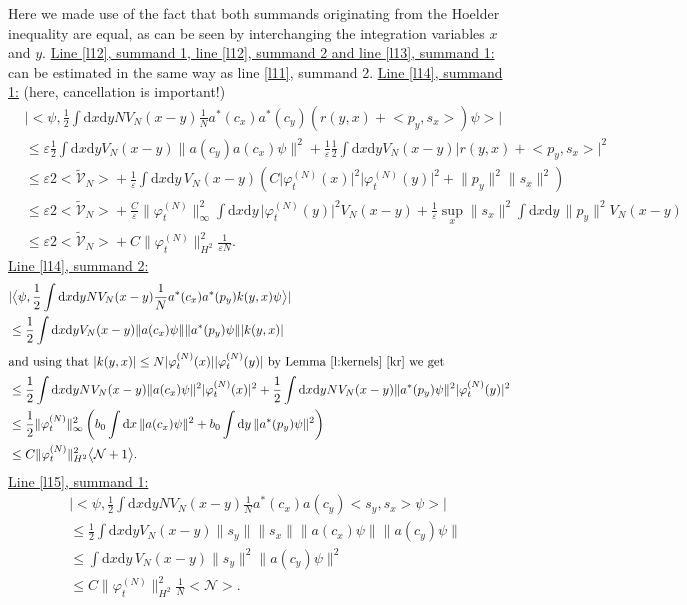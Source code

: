 \documentclass[11pt,a4paper,draft,DIV11]{scrartcl}	%
\newcommand{\di}{\textrm{d}}		%
\newcommand{\Ncal}{\mathcal{N}}		%
\newcommand{\tilV}{\tilde{\mathcal{V}}_N}		%
\newcommand{\estlist}[2]{\underline{Line \ref{l#1}, summand #2:}}
\newcommand{\nestlist}[2]{line \ref{l#1}, summand #2}
\newcommand{\Nestlist}[2]{Line \ref{l#1}, summand #2}
\newcommand{\scal}[2]{\big<#1,#2\big>} %
\newcommand{\norm}[1]{\lVert#1\rVert}	%
\newcommand{\ev}[1]{\big<#1\big>}	%
\newcommand{\ph}{\varphi_t^{(N)}}	%
\newcommand{\dxyNV}{\frac{1}{2}\int \di x\di y N V_N(x-y)} %
\newcommand{\dxyV}{\frac{1}{2}\int \di x\di y V_N(x-y)} %
\begin{document}
Here we made use of the fact that both summands originating from the Hoelder inequality are equal, as can be seen by interchanging the integration variables $x$ and $y$.\newline
\underline{\Nestlist{12}{1}, \nestlist{12}{2} and \nestlist{13}{1}:} can be estimated in the same way as \nestlist{11}{2}.\newline
\estlist{14}{1} (here, cancellation is important!)
\begin{align*}
& \lvert \scal{\psi}{\dxyNV \frac{1}{N}a^\ast(c_x) a^\ast(c_y) \left( r(y,x)+\scal{p_y}{s_x} \right)\psi} \rvert \\
& \leq \varepsilon \dxyV \norm{a(c_y)a(c_x)\psi}^2 + \frac{1}{\varepsilon} \dxyV \lvert r(y,x)+\scal{p_y}{s_x} \rvert^2 \\
& \leq \varepsilon 2\ev{\tilV} + \frac{1}{\varepsilon} \int \di x\di y\, V_N(x-y) \left( C\lvert\ph(x)\rvert^2\lvert\ph(y)\rvert^2 +\norm{p_y}^2\norm{s_x}^2 \right) \\
& \leq \varepsilon 2\ev{\tilV} + \frac{C}{\varepsilon} \norm{\ph}_\infty^2 \int \di x \di y\, \lvert \ph(y)\rvert^2 V_N(x-y) + \frac{1}{\varepsilon} \sup_x\norm{s_x}^2 \int \di x\di y\, \norm{p_y}^2 V_N(x-y) \\
& \leq \varepsilon 2\ev{\tilV} + C\norm{\ph}_{H^2}^2 \frac{1}{\varepsilon N}.
\end{align*}
\estlist{14}{2}
\begin{align*}
& \lvert \scal{\psi}{\dxyNV \frac{1}{N} a^\ast(c_x) a^\ast(p_y) k(y,x)\psi} \rvert \\
& \leq \dxyV \norm{a(c_x)\psi} \norm{a^\ast(p_y)\psi} \lvert k(y,x)\rvert \\
\intertext{and using that $\lvert k(y,x)\rvert \leq N\lvert \ph(x)\rvert\lvert \ph(y)\rvert$ by Lemma \ref{l:kernels} \ref{kr} we get}
& \leq \dxyNV \norm{a(c_x)\psi}^2 \lvert\ph(x)\rvert^2 + \dxyNV \norm{a^\ast(p_y)\psi}^2 \lvert \ph(y)\rvert^2\\
& \leq \frac{1}{2} \norm{\ph}_\infty^2 \left( b_0 \int \di x\,\norm{a(c_x)\psi}^2 + b_0 \int \di y\,\norm{a^\ast(p_y)\psi}^2 \right) \\
& \leq C \norm{\ph}_{H^2}^2 \ev{\Ncal+1}.
\end{align*}
\estlist{15}{1}
\begin{align*}
& \lvert \scal{\psi}{\dxyNV \frac{1}{N}a^\ast(c_x)a(c_y) \scal{s_y}{s_x}\psi} \rvert \\
& \leq \dxyV \norm{s_y} \norm{s_x} \norm{a(c_x)\psi} \norm{a(c_y)\psi} \\
& \leq \int \di x \di y\, V_N(x-y) \norm{s_y}^2 \norm{a(c_y)\psi}^2 \\
& \leq C \norm{\ph}_{H^2}^2 \frac{1}{N}\ev{\Ncal}. 
\end{align*}
\end{document}
